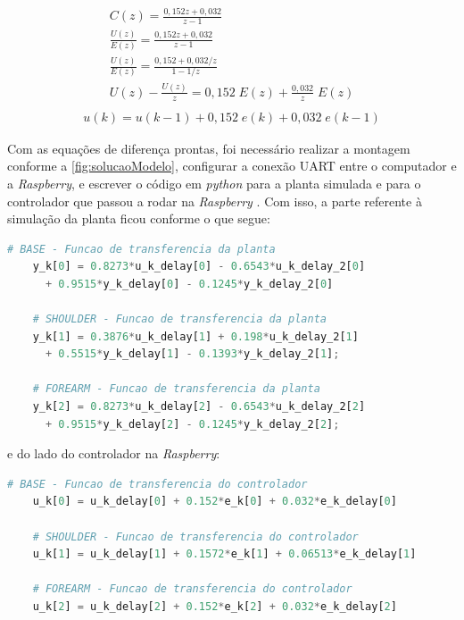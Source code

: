 \begin{equation*}
  \begin{gathered}
    C(z) = \frac{0,152z + 0,032}{z - 1}\\[0.5cm]
    \frac{U(z)}{E(z)} = \frac{0,152z + 0,032}{z - 1}\\[0.5cm]
    \frac{U(z)}{E(z)} = \frac{0,152 + 0,032/z}{1 - 1/z}\\[0.5cm]
    U(z) - \frac{U(z)}{z} = 0,152\;E(z) + \frac{0,032}{z}\;E(z)\\[0.5cm]
  \end{gathered}
  \label{eq:forearm_ctrl_diffEqIntro}
\end{equation*}
\begin{equation}
  \begin{gathered}
    u(k) = u(k-1) + 0,152\; e(k) + 0,032 \;e(k-1)
  \end{gathered}
  \label{eq:forearm_ctrl_diffEq}
\end{equation}

\newpage

Com as equações de diferença prontas, foi necessário realizar a montagem conforme a 
\autoref{fig:solucaoModelo}, configurar a conexão UART entre o computador e a 
\textit{Raspberry}, e escrever o código em \textit{python} para a planta simulada e
para o controlador que passou a rodar na \textit{Raspberry} \cite{lelis_hil2}. Com isso,
a parte referente à simulação da planta ficou conforme o que segue: \\

\begin{lstlisting}[language=Python]
	# BASE - Funcao de transferencia da planta
	y_k[0] = 0.8273*u_k_delay[0] - 0.6543*u_k_delay_2[0]
	  + 0.9515*y_k_delay[0] - 0.1245*y_k_delay_2[0]

	# SHOULDER - Funcao de transferencia da planta
	y_k[1] = 0.3876*u_k_delay[1] + 0.198*u_k_delay_2[1]
	  + 0.5515*y_k_delay[1] - 0.1393*y_k_delay_2[1];

	# FOREARM - Funcao de transferencia da planta
	y_k[2] = 0.8273*u_k_delay[2] - 0.6543*u_k_delay_2[2]
	  + 0.9515*y_k_delay[2] - 0.1245*y_k_delay_2[2];
\end{lstlisting}
e do lado do controlador na \textit{Raspberry}: \\

\begin{lstlisting}[language=Python]
	# BASE - Funcao de transferencia do controlador
	u_k[0] = u_k_delay[0] + 0.152*e_k[0] + 0.032*e_k_delay[0]

	# SHOULDER - Funcao de transferencia do controlador
	u_k[1] = u_k_delay[1] + 0.1572*e_k[1] + 0.06513*e_k_delay[1]

	# FOREARM - Funcao de transferencia do controlador
	u_k[2] = u_k_delay[2] + 0.152*e_k[2] + 0.032*e_k_delay[2]
\end{lstlisting}

